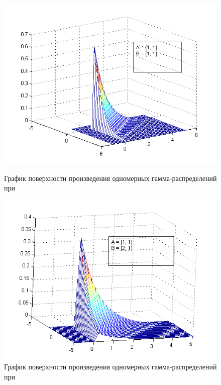 \begin{figure}[h]
  \begin{minipage}[h]{0.49\linewidth}
    \includegraphics[width=1\linewidth]{../pic/new/gamma_mesh_1}
    \caption{График поверхности произведения одномерных гамма-распределений при }\label{pic:gamma_mesh_start}
  \end{minipage}
  \hfill
  \begin{minipage}[h]{0.49\linewidth}
    \vspace{4mm}
    \includegraphics[width=1\linewidth]{../pic/new/gamma_mesh_2}
    \caption{График поверхности произведения одномерных гамма-распределений при }
  \end{minipage}
\end{figure}


